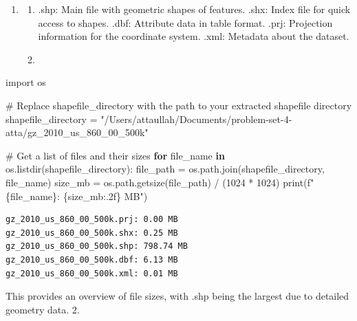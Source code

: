\documentclass[
  letterpaper,
  DIV=11,
  numbers=noendperiod]{scrartcl}
\newenvironment{Shaded}{\begin{snugshade}}{\end{snugshade}}
\newcommand{\BuiltInTok}[1]{\textcolor[rgb]{0.00,0.23,0.31}{#1}}
\newcommand{\CommentTok}[1]{\textcolor[rgb]{0.37,0.37,0.37}{#1}}
\newcommand{\ControlFlowTok}[1]{\textcolor[rgb]{0.00,0.23,0.31}{\textbf{#1}}}
\newcommand{\DecValTok}[1]{\textcolor[rgb]{0.68,0.00,0.00}{#1}}
\newcommand{\ImportTok}[1]{\textcolor[rgb]{0.00,0.46,0.62}{#1}}
\newcommand{\KeywordTok}[1]{\textcolor[rgb]{0.00,0.23,0.31}{\textbf{#1}}}
\newcommand{\NormalTok}[1]{\textcolor[rgb]{0.00,0.23,0.31}{#1}}
\newcommand{\OperatorTok}[1]{\textcolor[rgb]{0.37,0.37,0.37}{#1}}
\newcommand{\SpecialCharTok}[1]{\textcolor[rgb]{0.37,0.37,0.37}{#1}}
\newcommand{\SpecialStringTok}[1]{\textcolor[rgb]{0.13,0.47,0.30}{#1}}
\newcommand{\StringTok}[1]{\textcolor[rgb]{0.13,0.47,0.30}{#1}}
\providecommand{\tightlist}{%
  \setlength{\itemsep}{0pt}\setlength{\parskip}{0pt}}\usepackage{longtable,booktabs,array}
\begin{document}
\begin{enumerate}
\def\labelenumi{\arabic{enumi}.}
\tightlist
\item
  \begin{enumerate}
  \def\labelenumii{\alph{enumii}.}
  \tightlist
  \item
    .shp: Main file with geometric shapes of features. .shx: Index file
    for quick access to shapes. .dbf: Attribute data in table format.
    .prj: Projection information for the coordinate system. .xml:
    Metadata about the dataset.\\
  \item
  \end{enumerate}
\end{enumerate}

\begin{Shaded}
\begin{Highlighting}[]
\ImportTok{import}\NormalTok{ os}

\CommentTok{\# Replace \textquotesingle{}shapefile\_directory\textquotesingle{} with the path to your extracted shapefile directory}
\NormalTok{shapefile\_directory }\OperatorTok{=} \StringTok{"/Users/attaullah/Documents/problem{-}set{-}4{-}atta/gz\_2010\_us\_860\_00\_500k"}

\CommentTok{\# Get a list of files and their sizes}
\ControlFlowTok{for}\NormalTok{ file\_name }\KeywordTok{in}\NormalTok{ os.listdir(shapefile\_directory):}
\NormalTok{    file\_path }\OperatorTok{=}\NormalTok{ os.path.join(shapefile\_directory, file\_name)}
\NormalTok{    size\_mb }\OperatorTok{=}\NormalTok{ os.path.getsize(file\_path) }\OperatorTok{/}\NormalTok{ (}\DecValTok{1024} \OperatorTok{*} \DecValTok{1024}\NormalTok{)}
    \BuiltInTok{print}\NormalTok{(}\SpecialStringTok{f"}\SpecialCharTok{\{}\NormalTok{file\_name}\SpecialCharTok{\}}\SpecialStringTok{: }\SpecialCharTok{\{}\NormalTok{size\_mb}\SpecialCharTok{:.2f\}}\SpecialStringTok{ MB"}\NormalTok{)}
\end{Highlighting}
\end{Shaded}

\begin{verbatim}
gz_2010_us_860_00_500k.prj: 0.00 MB
gz_2010_us_860_00_500k.shx: 0.25 MB
gz_2010_us_860_00_500k.shp: 798.74 MB
gz_2010_us_860_00_500k.dbf: 6.13 MB
gz_2010_us_860_00_500k.xml: 0.01 MB
\end{verbatim}

This provides an overview of file sizes, with .shp being the largest due
to detailed geometry data. 2.
\end{document}
